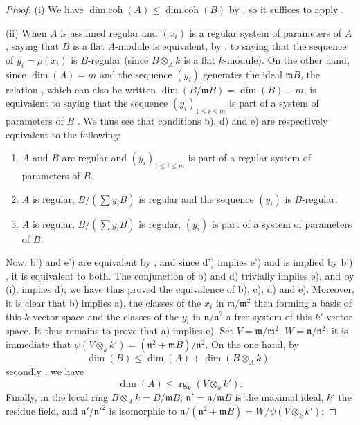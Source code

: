 \begin{proof}
(i) We have $\operatorname{dim.coh}(A)\leq\operatorname{dim.coh}(B)$ by , so it suffices to apply .

(ii) When $A$ is assumed regular and $(x_i)$ is a regular system of parameters of $A$, saying that $B$ is a flat $A$-module is equivalent, by , to saying that the sequence of $y_i=\rho(x_i)$ is $B$-regular (since $B\otimes_A k$ is a flat $k$-module).
On the other hand, since $\dim(A)=m$ and the sequence $(y_i)$ generates the ideal $\mathfrak{m}B$, the relation , which can also be written $\dim(B/\mathfrak{m}B)=\dim(B)-m$, is equivalent to saying that the sequence $(y_i)_{1\leq i\leq m}$ is part of a system of parameters of $B$ .
We thus see that conditions b), d) and e) are respectively equivalent to the following:
\begin{enumerate}
  \item[{\rm b')}] $A$ and $B$ are regular and $(y_i)_{1\leq i\leq m}$ is part of a regular system of parameters of $B$.
  \item[{\rm d')}] $A$ is regular, $B/(\sum y_i B)$ is regular and the sequence $(y_i)$ is $B$-regular.
  \item[{\rm e')}] $A$ is regular, $B/(\sum y_i B)$ is regular, $(y_i)$ is part of a system of parameters of $B$.
\end{enumerate}
Now, b') and e') are equivalent by , and since d') implies e') and is implied by b') , it is equivalent to both.
The conjunction of b) and d) trivially implies e), and by (i), implies d);
we have thus proved the equivalence of b), c), d) and e).
Moreover, it is clear that b) implies a), the classes of the $x_i$ in $\mathfrak{m}/\mathfrak{m}^2$ then forming a basis of this $k$-vector space and the classes of the $y_i$ in $\mathfrak{n}/\mathfrak{n}^2$ a free system of this $k'$-vector space.
It thus remains to prove that a) implies e).
Set $V=\mathfrak{m}/\mathfrak{m}^2$, $W=\mathfrak{n}/\mathfrak{n}^2$;
it is immediate that $\psi(V\otimes_k k')=(\mathfrak{n}^2+\mathfrak{m}B)/\mathfrak{n}^2$.
On the one hand, by 
\[
\label{0.17.3.3.3}
  \dim(B)\leq\dim(A)+\dim(B\otimes_A k);
  \tag{17.3.3.3}
\]
secondly , we have
\[
\label{0.17.3.3.4}
  \dim(A)\leq\operatorname{rg}_k(V\otimes_k k').
  \tag{17.3.3.4}
\]
Finally, in the local ring $B\otimes_A k=B/\mathfrak{m}B$, $\mathfrak{n}'=\mathfrak{n}/\mathfrak{m}B$ is the maximal ideal, $k'$ the residue field, and $\mathfrak{n}'/\mathfrak{n}'^2$ is isomorphic to $\mathfrak{n}/(\mathfrak{n}^2+\mathfrak{m}B)=W/\psi(V\otimes_k k')$;

\end{proof}
